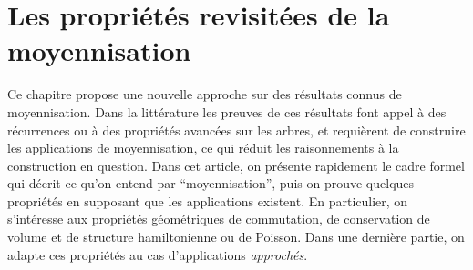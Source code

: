 
\clearemptydoublepage
\chapter{Les propriétés revisitées de la moyennisation}
\label{chap:avg}

Ce chapitre propose une nouvelle approche sur des résultats connus de
moyennisation. Dans la littérature les preuves de ces résultats font
appel à des récurrences ou à des propriétés avancées sur les arbres, et
requièrent de construire les applications de moyennisation, ce qui
réduit les raisonnements à la construction en question. Dans cet
article, on présente rapidement le cadre formel qui décrit ce qu'on
entend par \enquote{moyennisation}, puis on prouve quelques propriétés
en supposant que les applications existent. En particulier, on
s'intéresse aux propriétés géométriques de commutation, de conservation
de volume et de structure hamiltonienne ou de Poisson. Dans une dernière
partie, on adapte ces propriétés au cas d'applications
\textit{approchés}. 














